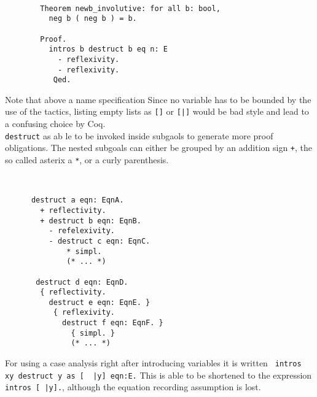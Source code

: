	\begin{example} ~\\\vspace{-10mm}
	  \begin{lstlisting}
	  	Theorem newb_involutive: for all b: bool,
	  	  neg b ( neg b ) = b.
	  	  
	  	Proof. 
	  	  intros b destruct b eq n: E
	  	    - reflexivity. 
	  	    - reflexivity. 
	  	   Qed.  
	  \end{lstlisting}
	\end{example}	 
	 Note that above a name specification %
	 Since no variable has to be bounded by the use of the tactics, listing empty lists as \lstinline![]! or \lstinline![|]! would be bad style and lead to a confusing choice by Coq.\\	 
	 \lstinline!destruct! as ab le to be invoked inside subgaols to generate more proof obligations.
	  The nested subgoals can either be grouped by an addition sign \lstinline!+!, the so called asterix a \lstinline!*!, or a curly parenthesis.
	  \begin{example} ~\\\vspace{-10mm}
	  \begin{lstlisting}
	  destruct a eqn: EqnA.
	    + reflectivity.
	    + destruct b eqn: EqnB.
	      - refelexivity.
	      - destruct c eqn: EqnC.
	          * simpl. 
	          (* ... *)       
	  
	   destruct d eqn: EqnD.
	    { reflectivity.
	      destruct e eqn: EqnE. } 
	       { reflexivity.
	         destruct f eqn: EqnF. } 
	           { simpl. }
	           (* ... *)   
	   \end{lstlisting}
	   \end{example}	 
	  For using a case analysis right after introducing variables it is written
	  \lstinline! intros xy destruct y as [  |y] eqn:E.!	
	  This is able to be shortened to the expression \lstinline! intros [ |y].!, although the equation recording assumption is lost.   
    
   
   
   
